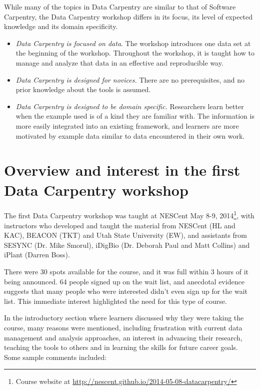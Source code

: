 \documentclass[11pt]{article}
\begin{document}
While many of the topics in Data Carpentry are similar to that of Software Carpentry, the Data Carpentry 
workshop differs in its focus, its level of expected knowledge and its domain specificity.
\begin{itemize}
\item \emph{Data Carpentry is focused on data}. The workshop introduces one data set at the beginning of the
workshop. Throughout the workshop, it is taught how to manage and analyze that data in an effective and reproducible 
way.
\item \emph{Data Carpentry is designed for novices.} There are no prerequisites, and no 
prior knowledge about the tools is assumed.
\item \emph{Data Carpentry is designed to be domain specific.} Researchers learn better when the example used is
of a kind they are familiar with. The information is more easily integrated into an existing framework, and learners 
are more motivated by example data similar to data encountered in their own work.
\end{itemize}

\section{Overview and interest in the first Data Carpentry workshop}

The first Data Carpentry workshop was taught at NESCent May 8-9, 2014\footnote{Course website at \url{http://nescent.github.io/2014-05-08-datacarpentry/}},
with instructors who developed and taught the material from NESCent
(HL and KAC), BEACON (TKT) and Utah State University (EW), and
assistants from SESYNC (Dr. Mike Smorul), iDigBio (Dr. Deborah Paul
and Matt Collins) and iPlant (Darren Boss).

There were 30 spots available for the course, and it was full within 3 hours of it being announced. 64 people signed up on the wait list, and anecdotal evidence suggests that many people who were interested didn't even sign up for the wait list. This immediate interest highlighted the need for this type of course.

In the introductory section where learners discussed why they were taking the course, many reasons were mentioned, including frustration with current data management and analysis approaches, an interest in advancing their research, teaching the tools to others and in learning the skills for future career goals. Some sample comments included:
\end{document}
